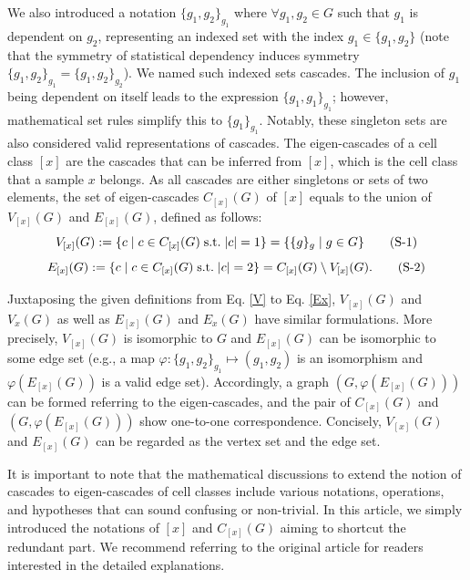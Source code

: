 \documentclass{article}
\begin{document}
We also introduced a notation $\{g_1, g_2\}_{g_1}$ where $\forall g_1,g_2\in G$ such that $g_1$ is dependent on $g_2$, representing an 
indexed set with the index $g_1\in\{g_1, g_2\}$ (note that the symmetry of statistical dependency induces symmetry 
$\{g_1, g_2\}_{g_1}=\{g_1, g_2\}_{g_2}$). We named such indexed sets cascades. The inclusion of $g_1$ being dependent on itself leads 
to the expression $\{g_1, g_1\}_{g_1}$; however, mathematical set rules simplify this to $\{g_1\}_{g_1}$. Notably, these singleton sets 
are also considered valid representations of cascades. The eigen-cascades of a cell class $[x]$ are the cascades that can 
be inferred from $[x]$, which is the cell class that a sample $x$ belongs. As all cascades are either singletons or sets of 
two elements, the set of eigen-cascades $C_{[x]}(G)$ of $[x]$ equals to the union of $V_{[x]}(G)$ and $E_{[x]}(G)$, defined as follows:
\begin{equation}\label{Vx}
  V_{[x]}(G):=\{c\;|\;c\in C_{[x]}(G)\;\text{s.t.}\; |c|=1\}=\{\{g\}_g\;|\;g\in G\}
  \stepcounter{equation} \tag{S-\theequation}
\end{equation}
\begin{equation}\label{Ex}
  E_{[x]}(G):=\{c\;|\;c\in C_{[x]}(G)\;\text{s.t.}\; |c|=2\}=C_{[x]}(G)\setminus V_{[x]}(G).
  \stepcounter{equation} \tag{S-\theequation}
\end{equation}

Juxtaposing the given definitions from Eq. \eqref{V} to Eq. \eqref{Ex}, $V_{[x]}(G)$ and $V_x(G)$ as well as $E_{[x]}(G)$ and $E_x(G)$ 
have similar formulations. More precisely, $V_{[x]}(G)$ is isomorphic to $G$ and $E_{[x]}(G)$ can be isomorphic to some edge 
set (e.g., a map $\varphi:\{g_1,g_2\}_{g_1}\mapsto(g_1,g_2)$ is an isomorphism and $\varphi(E_{[x]}(G))$ is a valid edge set). Accordingly, a 
graph $(G, \varphi(E_{[x]}(G)))$ can be formed referring to the eigen-cascades, and the pair of $C_{[x]}(G)$ and $(G, \varphi(E_{[x]}(G)))$ 
show one-to-one correspondence. Concisely, $V_{[x]}(G)$ and $E_{[x]}(G)$ can be regarded as the vertex set and the edge set.

It is important to note that the mathematical discussions to extend the notion of cascades to eigen-cascades 
of cell classes include various notations, operations, and hypotheses that can sound confusing or non-trivial. In 
this article, we simply introduced the notations of $[x]$ and $C_{[x]}(G)$ aiming to shortcut the redundant part. We 
recommend referring to the original article for readers interested in the detailed explanations.
\end{document}
